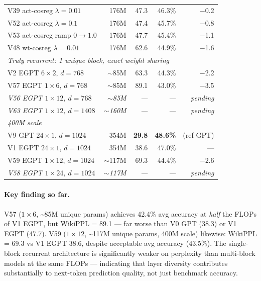 \begin{table}[ht]
\begin{tabular}{lrrrr}
V39 act-cosreg $\lambda{=}0.01$         & 176M & 47.3 & 46.3\% & $-$0.2 \\
V52 act-cosreg $\lambda{=}0.1$          & 176M & 47.4 & 45.7\% & $-$0.8 \\
V53 act-cosreg ramp $0{\to}1.0$         & 176M & 47.7 & 45.4\% & $-$1.1 \\
V48 wt-cosreg $\lambda{=}0.01$          & 176M & 62.6 & 44.9\% & $-$1.6 \\
\midrule
\multicolumn{5}{l}{\textit{Truly recurrent: 1 unique block, exact weight sharing}} \\
\midrule
V2  EGPT $6{\times}2$, $d{=}768$       & $\sim$85M & 63.3 & 44.3\% & $-$2.2 \\
V57 EGPT $1{\times}6$,  $d{=}768$       & $\sim$85M & 89.1 & 43.0\% & $-$3.5 \\
\textit{V56 EGPT $1{\times}12$, $d{=}768$} & \textit{$\sim$85M} & \textit{---} & \textit{---} & \textit{pending} \\
\textit{V63 EGPT $1{\times}12$, $d{=}1408$} & \textit{$\sim$160M} & \textit{---} & \textit{---} & \textit{pending} \\
\midrule
\multicolumn{5}{l}{\textit{400M scale}} \\
\midrule
V9  GPT $24{\times}1$, $d{=}1024$      & 354M & \textbf{29.8} & \textbf{48.6\%} & (ref GPT) \\
V1  EGPT $24{\times}1$, $d{=}1024$     & 354M & 38.6          & 47.0\%          & ---       \\
V59 EGPT $1{\times}12$, $d{=}1024$     & $\sim$117M & 69.3 & 44.4\% & $-$2.6 \\
\textit{V58 EGPT $1{\times}24$, $d{=}1024$} & \textit{$\sim$117M} & \textit{---} & \textit{---} & \textit{pending} \\
\bottomrule
\end{tabular}
\end{table}

\paragraph{Key finding so far.}
V57 ($1{\times}6$, \textasciitilde85M unique params) achieves 42.4\% avg accuracy at
\emph{half} the FLOPs of V1 EGPT, but WikiPPL = 89.1 --- far worse than V0 GPT (38.3)
or V1 EGPT (47.7).
V59 ($1{\times}12$, \textasciitilde117M unique params, 400M scale) likewise:
WikiPPL = 69.3 vs V1 EGPT 38.6, despite acceptable avg accuracy (43.5\%).
The single-block recurrent architecture is significantly weaker on perplexity
than multi-block models at the same FLOPs --- indicating that layer diversity
contributes substantially to next-token prediction quality, not just benchmark accuracy.

